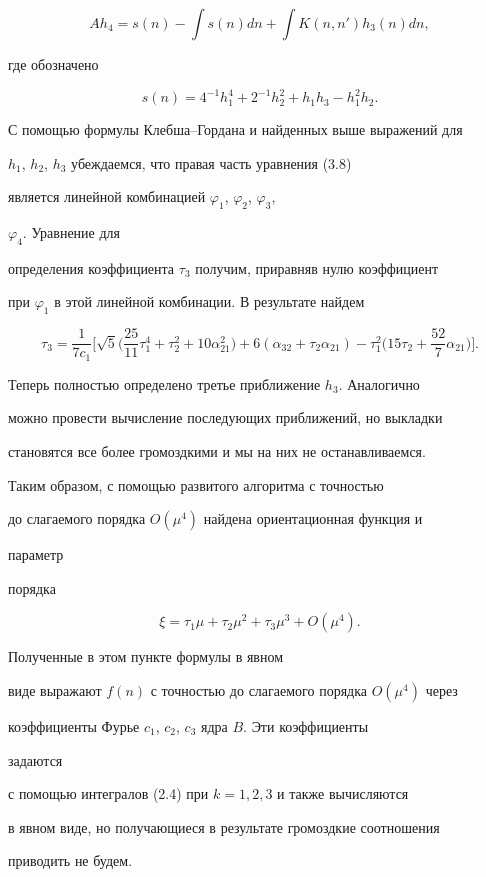 \begin{equation} 


A h_4=s(n)-\int s(n)dn+\int K(n,n')h_3(n)dn,\tag{3.8} 


\end{equation} 


где обозначено 


$$ 


s(n)=4^{-1}h^4_1+2^{-1}h^2_2+h_1h_3-h^2_1h_2. 


$$ 


С помощью формулы Клебша--Гордана и найденных выше выражений для 


$h_1$, $h_2$, $h_3$ убеждаемся, что правая часть уравнения (3.8) 


является линейной комбинацией $\varphi_1$, $\varphi_2$, $\varphi_3$, 


$\varphi_4$. Уравнение для 


определения коэффициента $\tau_3$ получим, приравняв нулю коэффициент 


при $\varphi_1$ в этой линейной комбинации. В результате найдем 


$$ 


\tau_3=\frac{1}{7c_1}\bigg[\sqrt{5}\bigg(\frac{25}{11}\tau^4_1+ 


\tau^2_2+10\alpha^2_{21}\bigg)+6(\alpha_{32}+\tau_2\alpha_{21})- 


\tau^2_1\bigg(15\tau_2+\frac{52}{7}\alpha_{21}\bigg)\bigg]. 


$$ 


Теперь полностью определено третье приближение $h_3$. Аналогично  


можно провести вычисление последующих приближений, но выкладки  


становятся все более громоздкими и мы на них не останавливаемся. 


 


Таким образом, с помощью развитого алгоритма с точностью 


до слагаемого порядка $O(\mu^4)$ найдена ориентационная функция и 


параметр 


порядка 


$$ 


\xi=\tau_1\mu+\tau_2\mu^2+\tau_3\mu^3+O(\mu^4). 


$$ 


 


\begin{note} Полученные в этом пункте формулы в явном 


виде выражают $f(n)$ с точностью до слагаемого порядка $O(\mu^4)$ через 


коэффициенты Фурье $c_1$, $c_2$, $c_3$ ядра $B$. Эти коэффициенты 


задаются 


с помощью интегралов (2.4) при $k=1,2,3$ и также вычисляются 


в явном виде, но получающиеся в результате громоздкие соотношения 


приводить не будем. 


\end{note} 


